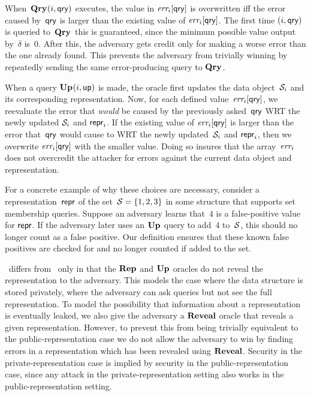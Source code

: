 When~$\textup{\textbf{Qry}}\hspace{0.5pt}(i,\mathsf{qry})$ executes, the value in $\textit{err}_i[\mathsf{qry}]$ is overwritten iff
the error caused by~$\mathsf{qry}$ is larger than the existing value of $\textit{err}_i[\mathsf{qry}]$.
The first time $(i,\mathsf{qry})$ is queried to~$\textup{\textbf{Qry}}\hspace{0.5pt}$ this is guaranteed, since the
minimum possible value output by~$\delta$ is~$0$. After this, the adversary gets
credit only for making a worse error than the one already found. This prevents
the adversary from trivially winning by repeatedly sending the same
error-producing query to $\textup{\textbf{Qry}}\hspace{0.5pt}$.

When a query $\textup{\textbf{Up}}\hspace{0.5pt}(i,\mathsf{up})$ is made, the oracle first updates the data
object~$\mathcal{S}_i$ and its corresponding representation.
%
Now, for each defined value~$\textit{err}_i[\mathsf{qry}]$, we reevaluate the error that
\emph{would} be caused by the previously asked~$\mathsf{qry}$ WRT the newly updated
$\mathcal{S}_i$ and $\mathsf{repr}_i$. If the existing value of $\textit{err}_i[\mathsf{qry}]$ is larger than
the error that~$\mathsf{qry}$ would cause to WRT the newly updated~$\mathcal{S}_i$ and
$\mathsf{repr}_i$, then we overwrite $\textit{err}_i[\mathsf{qry}]$ with the smaller value.  Doing so
insures that the array~$\textit{err}_i$ does not overcredit the attacker for errors
against the current data object and representation.

For a concrete example of why these choices are necessary, consider a
representation~$\mathsf{repr}$ of the set~$\mathcal{S} = \{1,2,3\}$ in some structure that
supports set membership queries. Suppose an adversary learns that~$4$ is a
false-positive value for $\mathsf{repr}$. If the adversary later uses an $\textup{\textbf{Up}}\hspace{0.5pt}$ query to
add~$4$ to~$\mathcal{S}$, this should no longer count as a false positive. Our
definition ensures that these known false positives are checked for and no
longer counted if added to the set.

\erreps\ differs from \errep\ only in that the $\textup{\textbf{Rep}}\hspace{0.5pt}$ and $\textup{\textbf{Up}}\hspace{0.5pt}$ oracles do not
reveal the representation to the adversary. This models the case where the data
structure is stored privately, where the adversary can ask queries but not see
the full representation. To model the possibility that information about a
representation is eventually leaked, we also give the adversary a $\mathbf{Reveal}$ oracle
that reveals a given representation. However, to prevent this from being
trivially equivalent to the public-representation case we do not allow the
adversary to win by finding errors in a representation which has been revealed
using $\mathbf{Reveal}$.
%
%
Security in the private-representation case is implied by security in the
public-representation case, since any attack in the private-representation
setting also works in the public-representation setting.
%


